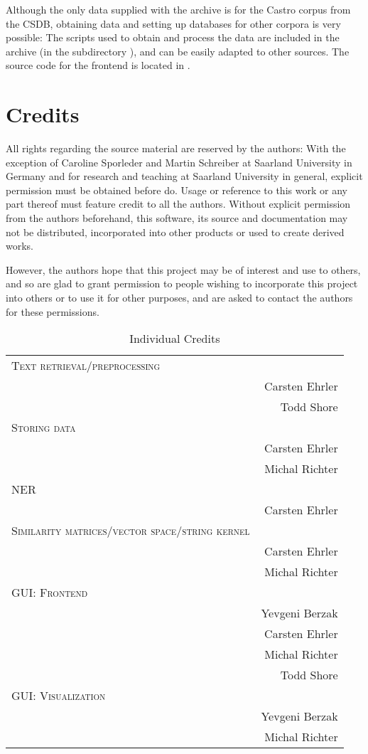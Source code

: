 Although the only data supplied with the archive is for the Castro corpus from the CSDB, obtaining data and setting up databases for other corpora is very possible: The scripts used to obtain and process the data are included in the archive (in the subdirectory ), and can be easily adapted to other sources. The source code for the frontend is located in .

\section{Credits}
All rights regarding the source material are reserved by the authors: With the exception of Caroline Sporleder and Martin Schreiber at Saarland University in Germany and for research and teaching at Saarland University in general, explicit permission must be obtained before do. Usage or reference to this work or any part thereof must feature credit to all the authors. Without explicit permission from the authors beforehand, this software, its source and documentation may not be distributed, incorporated into other products or used to create derived works.

However, the authors hope that this project may be of interest and use to others, and so are glad to grant permission to people wishing to incorporate this project into others or to use it for other purposes, and are asked to contact the authors for these permissions.

\begin{table}[h]
\centering
\caption{Individual Credits}
\begin{tabular}{l r}
\toprule
  	\textsc{Text retrieval/preprocessing} &  \\
  		& Carsten Ehrler \\
 		& Todd Shore \\
  	\textsc{Storing data} & \\
  		& Carsten Ehrler \\ 
  		& Michal Richter \\
	\textsc{NER} & \\
		& Carsten Ehrler \\
	\textsc{Similarity matrices/vector space/string kernel} & \\
		& Carsten Ehrler \\
		& Michal Richter \\
	\textsc{GUI: Frontend} & \\
		& Yevgeni Berzak \\
  		& Carsten Ehrler \\
		& Michal Richter \\
		& Todd Shore \\
	\textsc{GUI: Visualization} & \\
		& Yevgeni Berzak \\
		& Michal Richter \\
  \bottomrule
\end{tabular}
\end{table}
